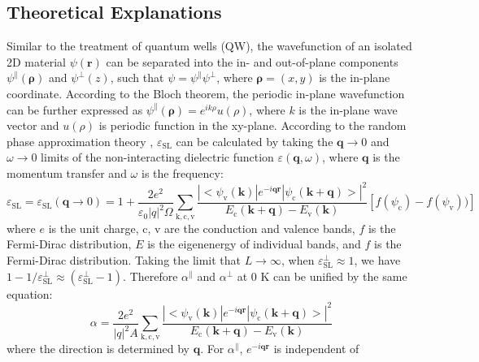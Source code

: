 \documentclass[journal=ancac3,manuscript=article,email=true,hyperref=true,keywords=false]{achemso}
\begin{document}
\subsection{Theoretical Explanations}
\label{sec:theory}

Similar to the treatment of quantum wells (QW), the wavefunction of an
isolated 2D material $\psi(\mathbf{r})$ can be separated into the in-
and out-of-plane components \cite{davies_physics_1997}
$\psi^{\parallel}(\mathbf{\rho})$ and $\psi^{\perp}(z)$, such that
$\psi=\psi^{\parallel}\psi^{\perp}$, where $\mathbf{\rho}=(x, y)$ is
the in-plane coordinate. According to the Bloch theorem, the periodic
in-plane wavefunction can be further expressed as
$\psi^{\parallel}(\mathbf{\rho})=e^{ik\rho}u(\rho)$, where $k$ is the
in-plane wave vector and $u(\rho)$ is periodic function in the
xy-plane. According to the random phase approximation theory
\cite{Adler_1962}, $\varepsilon_{\mathrm{SL}}$ can be calculated by
taking the $\mathbf{q} \to 0$ and $\omega \to 0$ limits of the
non-interacting dielectric function $\varepsilon(\mathbf{q}, \omega)$,
where $\mathbf{q}$ is the momentum transfer and $\omega$ is the
frequency:
\begin{equation}
  \label{eq:RPA-eps2}
  \varepsilon_{\mathrm{SL}}
  = \varepsilon_{\mathrm{SL}}(\mathbf{q} \to 0)
  = 1 + \frac{2e^{2}}{\varepsilon_{0} |q|^{2} \Omega}
  \sum_{\mathrm{k, c, v}}
  \frac{|<\psi_{\mathrm{v}}(\mathbf{k})|e^{-i\mathbf{q}\mathbf{r}}|\psi_{\mathrm{c}}(\mathbf{k+q})>|^{2}}
  {E_{\mathrm{c}}(\mathbf{k+q}) - E_{\mathrm{v}}(\mathbf{k})}
  \left[f(\psi_{\mathrm{c}}) - f(\psi_{\mathrm{v}}))\right]
\end{equation}
where $e$ is the unit charge, c, v are the conduction and valence
bands, $f$ is the Fermi-Dirac distribution, $E$ is the eigenenergy of
individual bands, and $f$ is the Fermi-Dirac distribution. Taking the
limit that $L\to\infty$, when
$\varepsilon^{\perp}_{\mathrm{SL}} \approx 1$, we have
$1-1/\varepsilon^{\perp}_{\mathrm{SL}} \approx
(\varepsilon_{\mathrm{SL}}^{\perp} - 1)$. Therefore $\alpha^{\parallel}$ and $\alpha^{\perp}$ at 0 K can be unified by the same equation:
\begin{equation}
  \label{eq:alpha-RPA}
  \alpha = \frac{2e^{2}}{|q|^{2}A} \sum_{\mathrm{k,c,v}}
  \frac{|<\psi_{\mathrm{v}}(\mathbf{k})|e^{-i\mathbf{q}\mathbf{r}}|\psi_{\mathrm{c}}(\mathbf{k+q})>|^{2}}
  {E_{\mathrm{c}}(\mathbf{k+q}) - E_{\mathrm{v}}(\mathbf{k})}
\end{equation}
where the direction is determined by $\mathbf{q}$. For
$\alpha^{\parallel}$, $e^{-i\mathbf{qr}}$ is independent of
\end{document}
